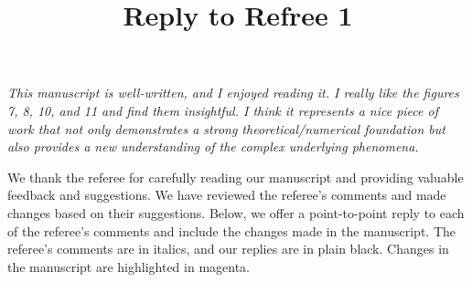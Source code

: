 \documentclass[]{article}
\title{\textbf{Reply to Refree 1}}
\date{\vspace{-5ex}}
\begin{document}
\maketitle %

 \textit{This manuscript is well-written, and I enjoyed reading it. I really like the figures 7, 8,
10, and 11 and find them insightful. I think it represents a nice piece of work that not only
demonstrates a strong theoretical/numerical foundation but also provides a new
understanding of the complex underlying phenomena. }

We thank the referee for carefully reading our manuscript and providing valuable feedback and suggestions. We have reviewed the referee’s comments and made changes based on their suggestions. Below, we offer a point-to-point reply to each of the referee’s comments and include the changes made in the manuscript. The referee’s comments are in italics, and our replies are in plain black. Changes in the manuscript are highlighted in magenta.
\end{document}
